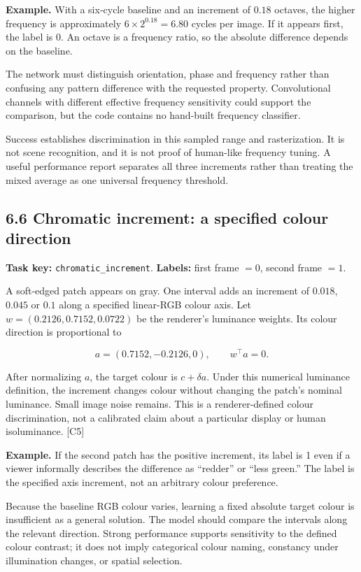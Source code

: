 \documentclass[
  11pt,
]{article}
\let\oldsubsection\subsection
\renewcommand{\subsection}{\Needspace{6\baselineskip}\oldsubsection}
\begin{document}
\textbf{Example.} With a six-cycle baseline and an increment of \(0.18\)
octaves, the higher frequency is approximately \(6\times2^{0.18}=6.80\)
cycles per image. If it appears first, the label is 0. An octave is a
frequency ratio, so the absolute difference depends on the baseline.

The network must distinguish orientation, phase and frequency rather
than confusing any pattern difference with the requested property.
Convolutional channels with different effective frequency sensitivity
could support the comparison, but the code contains no hand-built
frequency classifier.

Success establishes discrimination in this sampled range and
rasterization. It is not scene recognition, and it is not proof of
human-like frequency tuning. A useful performance report separates all
three increments rather than treating the mixed average as one universal
frequency threshold.

\subsection{6.6 Chromatic increment: a specified colour
direction}\label{chromatic-increment-a-specified-colour-direction}

\textbf{Task key:} \texttt{chromatic\_increment}. \textbf{Labels:} first
frame \(=0\), second frame \(=1\).

A soft-edged patch appears on gray. One interval adds an increment of
\(0.018\), \(0.045\) or \(0.1\) along a specified linear-RGB colour
axis. Let \(w=(0.2126,0.7152,0.0722)\) be the renderer's luminance
weights. Its colour direction is proportional to

\[a=(0.7152,-0.2126,0),\qquad w^\top a=0.\]

After normalizing \(a\), the target colour is \(c+\delta a\). Under this
numerical luminance definition, the increment changes colour without
changing the patch's nominal luminance. Small image noise remains. This
is a renderer-defined colour discrimination, not a calibrated claim
about a particular display or human isoluminance. {[}C5{]}

\textbf{Example.} If the second patch has the positive increment, its
label is 1 even if a viewer informally describes the difference as
``redder'' or ``less green.'' The label is the specified axis increment,
not an arbitrary colour preference.

Because the baseline RGB colour varies, learning a fixed absolute target
colour is insufficient as a general solution. The model should compare
the intervals along the relevant direction. Strong performance supports
sensitivity to the defined colour contrast; it does not imply
categorical colour naming, constancy under illumination changes, or
spatial selection.
\end{document}
